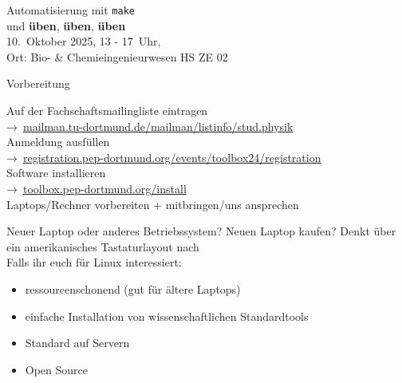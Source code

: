 \begin{frame}
  \begin{center}
    \huge Automatisierung mit \texttt{make}\\[0.5\baselineskip]
    und \textbf{üben}, \textbf{üben}, \textbf{üben}\\[0.5\baselineskip]
    10.~Oktober 2025, 13 - 17~Uhr,\\
    Ort: Bio- \& Chemieingenieurwesen HS ZE 02
  \end{center}
\end{frame}

\begin{frame}{Vorbereitung}
  \begin{center}
    \huge
    Auf der Fachschaftsmailingliste eintragen \\
    →~\href{https://mailman.tu-dortmund.de/mailman/listinfo/stud.physik}{mailman.tu-dortmund.de/mailman/listinfo/stud.physik}\\[0.5\baselineskip]
    Anmeldung ausfüllen\\
    →~\textcolor{blue!70!black}{\href{https://registration.pep-dortmund.org/events/toolbox25/registration/}{registration.pep-dortmund.org/events/toolbox24/registration}}\\[0.5\baselineskip]
    Software installieren\\
    →~\textcolor{blue!70!black}{\href{https://toolbox.pep-dortmund.org/install/install/}{toolbox.pep-dortmund.org/install}}\\[0.5\baselineskip]
    Laptops/Rechner vorbereiten + mitbringen/uns ansprechen
  \end{center}
\end{frame}
\begin{frame}{Neuer Laptop oder anderes Betriebssystem?}
  \huge
  Neuen Laptop kaufen? \newline
  Denkt über ein amerikanisches Tastaturlayout nach\\[0.5\baselineskip]

  Falls ihr euch für Linux interessiert:
	\begin{itemize}
		\item ressourcenschonend (gut für ältere Laptops)
		\item einfache Installation von wissenschaftlichen Standardtools
		\item Standard auf Servern
		\item Open Source
	\end{itemize}
\end{frame}
